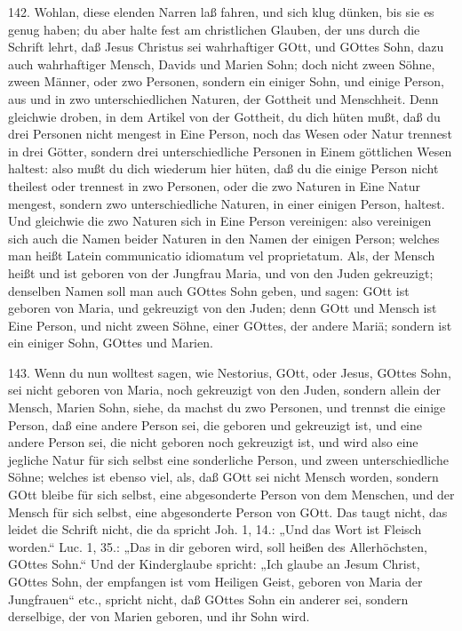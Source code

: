 142. Wohlan, diese elenden Narren laß fahren, und sich klug dünken, bis sie es genug haben; du aber halte fest am christlichen Glauben, der uns durch die Schrift lehrt, daß Jesus Christus sei wahrhaftiger GOtt, und GOttes Sohn, dazu auch wahrhaftiger Mensch, Davids und Marien Sohn; doch nicht zween Söhne, zween Männer, oder zwo Personen, sondern ein einiger Sohn, und einige Person, aus und in zwo unterschiedlichen Naturen, der Gottheit und Menschheit. Denn gleichwie droben, in dem Artikel von der Gottheit, du dich hüten mußt, daß du drei Personen nicht mengest in Eine Person, noch das Wesen oder Natur trennest in drei Götter, sondern drei unterschiedliche Personen in Einem göttlichen Wesen haltest: also mußt du dich wiederum hier hüten, daß du die einige Person nicht theilest oder trennest in zwo Personen, oder die zwo Naturen in Eine Natur mengest, sondern zwo unterschiedliche Naturen, in einer einigen Person, haltest. Und gleichwie die zwo Naturen sich in Eine Person vereinigen: also vereinigen sich auch die Namen beider Naturen in den Namen der einigen Person; welches man heißt Latein communicatio idiomatum vel proprietatum. Als, der Mensch heißt und ist geboren von der Jungfrau Maria, und von den Juden gekreuzigt; denselben Namen soll man auch GOttes Sohn geben, und sagen: GOtt ist geboren von Maria, und gekreuzigt von den Juden; denn GOtt und Mensch ist Eine Person, und nicht zween Söhne, einer GOttes, der andere Mariä; sondern ist ein einiger Sohn, GOttes und Marien.

143. Wenn du nun wolltest sagen, wie Nestorius, GOtt, oder Jesus, GOttes Sohn, sei nicht geboren von Maria, noch gekreuzigt von den Juden, sondern allein der Mensch, Marien Sohn, siehe, da machst du zwo Personen, und trennst die einige Person, daß eine andere Person sei, die geboren und gekreuzigt ist, und eine andere Person sei, die nicht geboren noch gekreuzigt ist, und wird also eine jegliche Natur für sich selbst eine sonderliche Person, und zween unterschiedliche Söhne; welches ist ebenso viel, als, daß GOtt sei nicht Mensch worden, sondern GOtt bleibe für sich selbst, eine abgesonderte Person von dem Menschen, und der Mensch für sich selbst, eine abgesonderte Person von GOtt. Das taugt nicht, das leidet die Schrift nicht, die da spricht Joh. 1, 14.: „Und das Wort ist Fleisch worden.“ Luc. 1, 35.: „Das in dir geboren wird, soll heißen des Allerhöchsten, GOttes Sohn.“ Und der Kinderglaube spricht: „Ich glaube an Jesum Christ, GOttes Sohn, der empfangen ist vom Heiligen Geist, geboren von Maria der Jungfrauen“ etc., spricht nicht, daß GOttes Sohn ein anderer sei, sondern derselbige, der von Marien geboren, und ihr Sohn wird.

